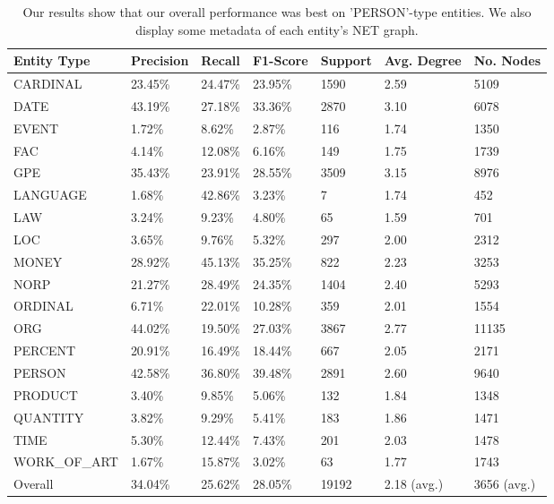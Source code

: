 \documentclass[11pt,a4paper]{article}
\begin{document}
\begin{table}[ht]
\begin{tabular}{lllllll}
\toprule
Entity Type   & Precision & Recall  & F1-Score & Support  & Avg. Degree & No. Nodes \\ 
\midrule
CARDINAL      & 23.45\%   & 24.47\% & 23.95\%  & 1590     & 2.59        & 5109       \\
DATE          & 43.19\%   & 27.18\% & 33.36\%  & 2870     & 3.10        & 6078    \\
EVENT         & 1.72\%    & 8.62\%  & 2.87\%   & 116      & 1.74        & 1350   \\
FAC           & 4.14\%    & 12.08\% & 6.16\%   & 149      & 1.75        & 1739 \\
GPE           & 35.43\%   & 23.91\% & 28.55\%  & 3509     & 3.15        & 8976    \\
LANGUAGE      & 1.68\%    & 42.86\% & 3.23\%   & 7        & 1.74        & 452      \\
LAW           & 3.24\%    & 9.23\%  & 4.80\%   & 65       & 1.59        & 701 \\
LOC           & 3.65\%    & 9.76\%  & 5.32\%   & 297      & 2.00        & 2312 \\
MONEY         & 28.92\%   & 45.13\% & 35.25\%  & 822      & 2.23        & 3253     \\
NORP          & 21.27\%   & 28.49\% & 24.35\%  & 1404     & 2.40        & 5293    \\
ORDINAL       & 6.71\%    & 22.01\% & 10.28\%  & 359      & 2.01        & 1554     \\
ORG           & 44.02\%   & 19.50\% & 27.03\%  & 3867     & 2.77        & 11135    \\
PERCENT       & 20.91\%   & 16.49\% & 18.44\%  & 667      & 2.05        & 2171 \\
PERSON        & 42.58\%   & 36.80\% & 39.48\%  & 2891     & 2.60        & 9640    \\
PRODUCT       & 3.40\%    & 9.85\%  & 5.06\%   & 132      & 1.84        & 1348 \\
QUANTITY      & 3.82\%    & 9.29\%  & 5.41\%   & 183      & 1.86        & 1471 \\
TIME          & 5.30\%    & 12.44\% & 7.43\%   & 201      & 2.03        & 1478 \\
WORK\_OF\_ART & 1.67\%    & 15.87\% & 3.02\%   & 63       & 1.77        & 1743 \\ 
\midrule
Overall       & 34.04\%   & 25.62\% & 28.05\%  & 19192    & 2.18 (avg.)  & 3656 (avg.)
\end{tabular}
\caption{Our results show that our overall performance was best on 'PERSON'-type entities. We also display some metadata of each entity's NET graph.}
\label{outcomes}
\end{table}
\end{document}
